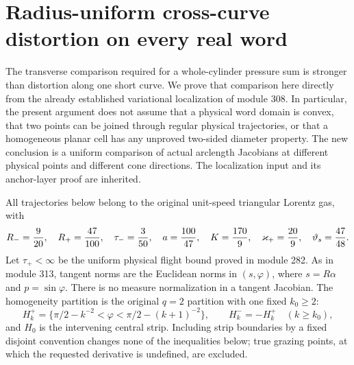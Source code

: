 \section{Radius-uniform cross-curve distortion on every real word}
\label{sec:xd-cross-curve}

The transverse comparison required for a whole-cylinder pressure sum
is stronger than distortion along one short curve.  We prove that
comparison here directly from the already established variational
localization of module 308.  In particular, the present argument does
not assume that a physical word domain is convex, that two points can
be joined through regular physical trajectories, or that a homogeneous
planar cell has any unproved two-sided diameter property.
The new conclusion is a uniform comparison of actual arclength
Jacobians at different physical points and different cone directions.
The localization input and its anchor-layer proof are inherited.

All trajectories below belong to the original unit-speed triangular
Lorentz gas, with
\[
 R_-={9\over20},\quad R_+={47\over100},\quad
 \tau_-={3\over50},\quad
 a={100\over47},\quad K={170\over9},\quad
 \varkappa_+={20\over9},\quad \vartheta_s={47\over48}.
\]
Let $\tau_+<\infty$ be the uniform physical flight bound proved in
module 282.  As in module 313, tangent norms are the Euclidean norms
in $(s,\varphi)$, where $s=R\alpha$ and $p=\sin\varphi$.
There is no measure normalization in a tangent Jacobian.
The homogeneity partition is the original $q=2$ partition with one
fixed $k_0\ge2$:
\[
 H_k^+=\{\pi/2-k^{-2}<\varphi<\pi/2-(k+1)^{-2}\},\qquad
 H_k^-=-H_k^+\quad(k\ge k_0),
\]
and $H_0$ is the intervening central strip.  Including strip boundaries
by a fixed disjoint convention changes none of the inequalities below;
true grazing points, at which the requested derivative is undefined,
are excluded.

